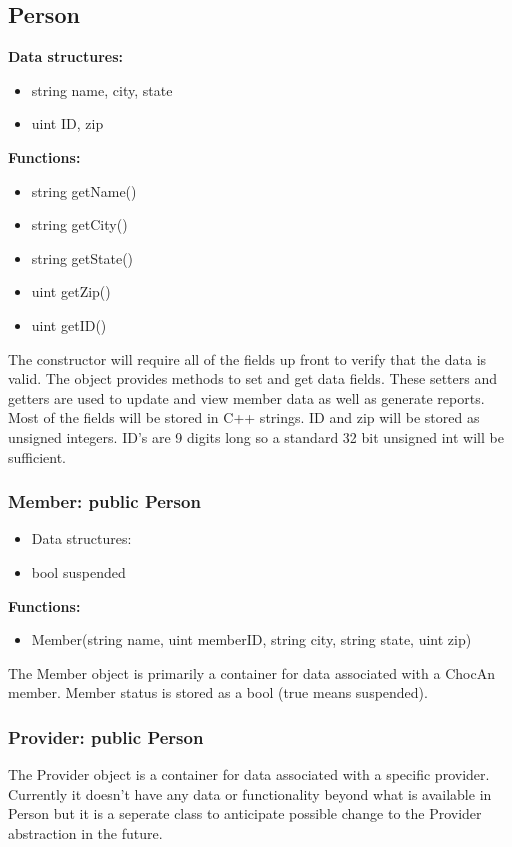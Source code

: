 \documentclass{article}
\begin{document}
\subsection{Person}
\textbf{Data structures:}
\begin{itemize}
   \item string name, city, state
   \item uint ID, zip
\end{itemize}
\textbf{Functions:}
\begin{itemize}
   \item string getName()
   \item string getCity()
   \item string getState()
   \item uint getZip()
   \item uint getID()
\end{itemize}
The constructor will require all of the fields up front to verify that the data is valid. The object provides methods to set and get data fields. These setters and getters are used to update and view member data as well as generate reports. Most of the fields will be stored in C++ strings. ID and zip will be stored as unsigned integers. ID’s are 9 digits long so a standard 32 bit unsigned int will be sufficient.

\subsubsection{Member: public Person}
\begin{itemize}
   \item Data structures:
   \item bool suspended
\end{itemize}
\textbf{Functions:}
\begin{itemize}
   \item Member(string name, uint memberID, string city, string state, uint zip)
\end{itemize}
The Member object is primarily a container for data associated with a ChocAn member. Member status is stored as a bool (true means suspended). 

\subsubsection{Provider: public Person}
The Provider object is a container for data associated with a specific provider. Currently it doesn’t have any data or functionality beyond what is available in Person but it is a seperate class to anticipate possible change to the Provider abstraction in the future.
\end{document}
